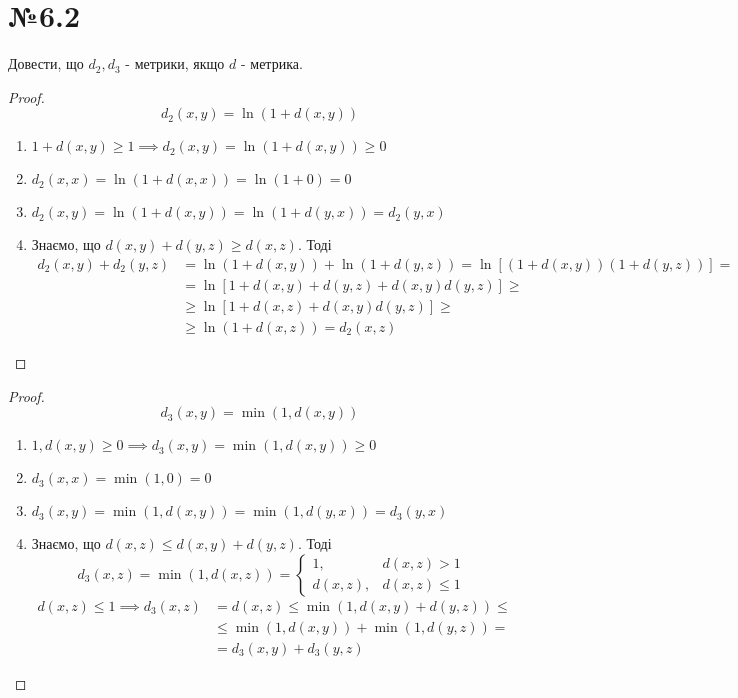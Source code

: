 \documentclass[11pt, a4paper]{article} %
\begin{document}

\section*{№6.2}
\begin{mdframed}
    Довести, що $d_2,d_3$ - метрики, якщо $d$ - метрика.
\end{mdframed}

\begin{proof}
    \[d_2(x,y) = \ln(1 + d(x,y))\]
    \begin{enumerate}
        \item \(1 + d(x,y) \ge 1 \implies d_2(x,y) = \ln (1 + d(x,y)) \ge 0\)
        \item \(d_2(x,x) = \ln(1 + d(x,x)) = \ln(1 + 0) = 0\)
        \item \(d_2(x,y) = \ln(1 + d(x,y)) = \ln(1 + d(y,x)) = d_2(y,x)\)
        \item Знаємо, що \(d(x,y) + d(y,z) \ge d(x,z)\). Тоді
        \begin{align*}
            d_2(x,y) + d_2(y,z) &= \ln(1 + d(x,y)) + \ln(1 + d(y,z)) = \ln\left[(1 + d(x,y))(1 + d(y,z))\right] = \\
            &= \ln\left[1 + d(x,y) + d(y,z) + d(x,y)d(y,z)\right] \ge\\
            &\ge \ln\left[1 + d(x,z) + d(x,y)d(y,z)\right] \ge \\
            &\ge \ln(1 + d(x,z)) = d_2(x,z)
        \end{align*}
    \end{enumerate}
\end{proof}
    
\begin{proof}
    \[d_3(x,y) = \min(1, d(x,y))\]
    \begin{enumerate}
        \item \(1, d(x,y) \ge 0 \implies d_3(x,y) = \min(1, d(x,y)) \ge 0\)
        \item \(d_3(x,x) = \min(1, 0) = 0\)
        \item \(d_3(x,y) = \min(1, d(x,y)) = \min(1, d(y,x)) = d_3(y,x)\)
        \item Знаємо, що \(d(x,z) \le d(x,y) + d(y,z)\). Тоді
        \[d_3(x,z) = \min(1, d(x,z)) = \begin{cases}
            1, & d(x,z) > 1 \\
            d(x,z), & d(x,z) \le 1
        \end{cases}\]
        \begin{align*}
            d(x,z) \le 1 \implies d_3(x,z) &= d(x,z) \le \min(1, d(x,y) + d(y,z)) \le \\
            &\le \min(1, d(x,y)) + \min(1, d(y,z)) = \\
            &= d_3(x,y) + d_3(y,z)
        \end{align*}
    \end{enumerate}
    
\end{proof}
\end{document}
